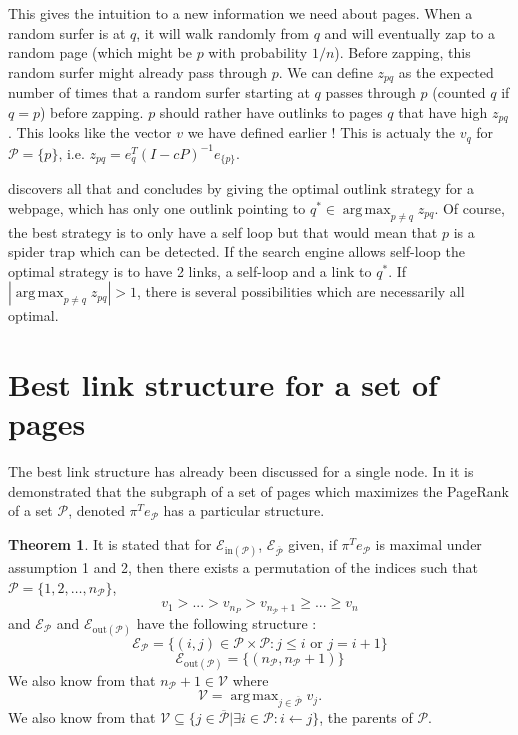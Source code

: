 \documentclass{article}
\DeclareMathOperator*{\argmax}{arg\,max}
\newcommand{\1}{\mathbf{1}}
\theoremstyle{definition}
\newtheorem{mytheo}[mydef]{Theorem}
\begin{document}
This gives the intuition to a new information we need about pages.
When a random surfer is at $q$, it will walk randomly from $q$ and will eventually zap to a random page (which might be $p$ with probability $1/n$).
Before zapping, this random surfer might already pass through $p$.
We can define $z_{pq}$ as the expected number of times that a random surfer starting at $q$ passes through $p$ (counted $q$ if $q=p$) before zapping.
$p$ should rather have outlinks to pages $q$ that have high $z_{pq}$.
This looks like the vector $v$ we have defined earlier !
This is actualy the $v_q$ for $\mathcal{P} = \{p\}$, i.e. $z_{pq} = e_q^T(I-cP)^{-1}e_{\{p\}}$.

\cite{avrachenkov2006effect} discovers all that and concludes by giving the optimal outlink strategy for a webpage,
which has only one outlink pointing to $q^* \in \argmax_{p \neq q} z_{pq}$.
Of course, the best strategy is to only have a self loop but that would mean that $p$ is a spider trap which can be detected.
If the search engine allows self-loop the optimal strategy is to have 2 links, a self-loop and a link to $q^*$.
If $|\argmax_{p \neq q} z_{pq}| > 1$, there is several possibilities which are necessarily all optimal.



\section{Best link structure for a set of pages}
The best link structure has already been discussed for a single node.
In \cite{de2008maximizing} it is demonstrated that the subgraph of a set of pages which maximizes the PageRank of a set $\mathcal{P}$, denoted $\pi^T e_{\mathcal{P}}$ has a particular structure.

\begin{mytheo}
  It is stated that for $\mathcal{E}_{\text{in}(\mathcal{P})}$, $\mathcal{E}_{\overline{\mathcal{P}}}$ given, if  $\pi^T e_{\mathcal{P}}$ is maximal under assumption 1 and 2, then there exists a permutation of the indices such that 
$\mathcal{P} = \{1,2, \hdots, n_{\mathcal{P}}\}$,
$$ v_1 > ... > v_{n_P}>v_{n_{\mathcal{P}}+1} \geq ... \geq v_n$$
and $\mathcal{E}_{\mathcal{P}}$ and $\mathcal{E}_{\text{out}(\mathcal{P})} $ have the following structure :
$$\mathcal{E}_{\mathcal{P}} = \{(i,j) \in \mathcal{P}\times \mathcal{P} : j \leq i \text{ or }j = i+1 \}$$
$$\mathcal{E}_{\text{out}(\mathcal{P})} = \{(n_{\mathcal{P}},n_{\mathcal{P}}+1)\}$$
We also know from \cite{de2008maximizing} that $n_\mathcal{P}+1 \in \mathcal{V}$ where
\[ \mathcal{V} = \argmax_{j \in \overline{\mathcal{P}}} v_j. \]
We also know from \cite{de2008maximizing} that $\mathcal{V} \subseteq \{j \in \overline{\mathcal{P}} | \exists i \in \mathcal{P} : i \leftarrow j\}$, the parents of $\mathcal{P}$.
\label{thm:optstruct}
\end{mytheo}
\end{document}
